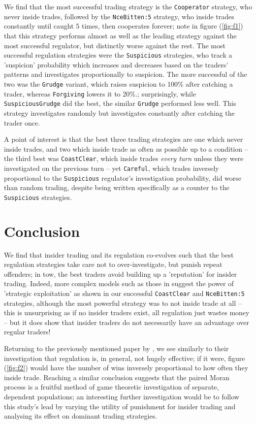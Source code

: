\documentclass{article}
\begin{document}
We find that the most successful trading strategy is the \texttt{Cooperator} strategy, who never inside trades, followed by the \texttt{NceBitten:5} strategy, who inside trades constantly until caught 5 times, then cooperates forever; note in figure (\ref{fig:f1}) that this strategy performs almost as well as the leading strategy against the most successful regulator, but distinctly worse against the rest. The most successful regulation strategies were the \texttt{Suspicious} strategies, who track a 'suspicion' probability which increases and decreases based on the traders' patterns and investigates proportionally to suspicion. The more successful of the two was the \texttt{Grudge} variant, which raises suspicion to 100\% after catching a trader, whereas \texttt{Forgiving} lowers it to 20\%.; surprisingly, while \texttt{SuspiciousGrudge} did the best, the similar \texttt{Grudge} performed less well. This strategy investigates randomly but investigates constantly after catching the trader once.

A point of interest is that the best three trading strategies are one which never inside trades, and two which inside trade as often as possible up to a condition -- the third best was \texttt{CoastClear}, which inside trades \emph{every turn} unless they were investigated on the previous turn -- yet \texttt{Careful}, which trades inversely proportional to the \texttt{Suspicious} regulator's investigation probability, did worse than random trading, despite being written specifically as a counter to the \texttt{Suspicious} strategies.

\section{Conclusion}
We find that insider trading and its regulation co-evolves such that the best regulation strategies take care not to over-investigate, but punish repeat offenders; in tow, the best traders avoid building up a 'reputation' for insider trading. Indeed, more complex models such as those in \textcite{kyle1985continuous} suggest the power of 'strategic exploitation' as shown in our successful \texttt{CoastClear} and \texttt{NceBitten:5} strategies, although the most powerful strategy was to not inside trade at all -- this is unsurprising as if no insider traders exist, all regulation just wastes money -- but it does show that insider traders do not necessarily have an advantage over regular traders!

Returning to the previously mentioned paper by \textcite{smales2017game}, we see similarly to their investigation that regulation is, in general, not hugely effective; if it were, figure (\ref{fig:f2}) would have the number of wins inversely proportional to how often they inside trade. Reaching a similar conclusion suggests that the paired Moran process is a fruitful method of game theoretic investigation of separate, dependent populations; an interesting further investigation would be to follow this study's lead by varying the utility of punishment for insider trading and analysing its effect on dominant trading strategies.
\begingroup
\setlength\bibitemsep{0pt}
\printbibliography
\endgroup
\end{document}

